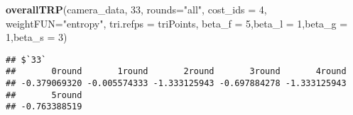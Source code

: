\documentclass[]{article}
\newenvironment{Shaded}{\begin{snugshade}}{\end{snugshade}}
\newcommand{\KeywordTok}[1]{\textcolor[rgb]{0.13,0.29,0.53}{\textbf{{#1}}}}
\newcommand{\DataTypeTok}[1]{\textcolor[rgb]{0.13,0.29,0.53}{{#1}}}
\newcommand{\DecValTok}[1]{\textcolor[rgb]{0.00,0.00,0.81}{{#1}}}
\newcommand{\StringTok}[1]{\textcolor[rgb]{0.31,0.60,0.02}{{#1}}}
\newcommand{\NormalTok}[1]{{#1}}
\begin{document}
\begin{Shaded}
\begin{Highlighting}[]
\KeywordTok{overallTRP}\NormalTok{(camera_data, }\DecValTok{33}\NormalTok{, }\DataTypeTok{rounds=}\StringTok{"all"}\NormalTok{, }\DataTypeTok{cost_ids =} \DecValTok{4}\NormalTok{, }\DataTypeTok{weightFUN=}\StringTok{"entropy"}\NormalTok{,}
           \DataTypeTok{tri.refps =} \NormalTok{triPoints, }\DataTypeTok{beta_f =} \DecValTok{5}\NormalTok{,}\DataTypeTok{beta_l =} \DecValTok{1}\NormalTok{,}\DataTypeTok{beta_g =} \DecValTok{1}\NormalTok{,}\DataTypeTok{beta_s =} \DecValTok{3}\NormalTok{)}
\end{Highlighting}
\end{Shaded}

\begin{verbatim}
## $`33`
##       0round       1round       2round       3round       4round 
## -0.379069320 -0.005574333 -1.333125943 -0.697884278 -1.333125943 
##       5round 
## -0.763388519
\end{verbatim}
\end{document}
